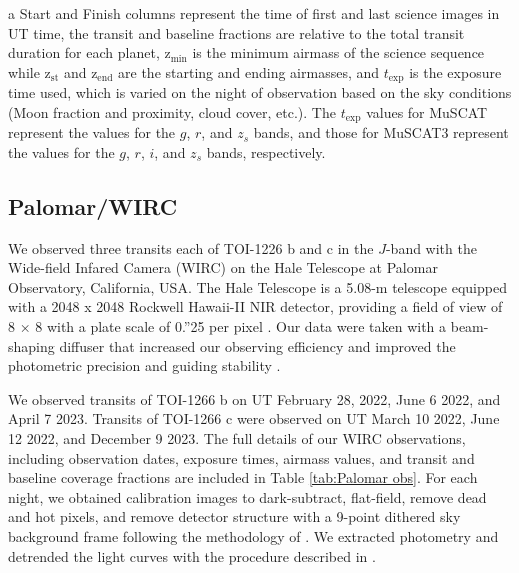 \documentclass[twocolumn]{aastex631}
\begin{document}
\begin{table}
\begin{tabular}{ccccccccccc}
\\ 
\hline
\end{tabular}
\begin{tablenotes}
      \item[a] Start and Finish columns represent the time of first and last science images in UT time, the transit and baseline fractions are relative to the total transit duration for each planet, z$_{\text{min}}$ is the minimum airmass of the science sequence while z$_{\text{st}}$ and z$_{\text{end}}$ are the starting and ending airmasses, and $t_{\text{exp}}$ is the exposure time used, which is varied on the night of observation based on the sky conditions (Moon fraction and proximity, cloud cover, etc.). The $t_{\text{exp}}$ values for MuSCAT represent the values for the $g$, $r$, and $z_s$ bands, and those for MuSCAT3 represent the values for the $g$, $r$, $i$, and $z_s$ bands, respectively.
\end{tablenotes}
\end{table}

\subsection{Palomar/WIRC}

We observed three transits each of TOI-1226 b and c in the $J$-band with the Wide-field Infared Camera (WIRC) on the Hale Telescope at Palomar Observatory, California, USA. The Hale Telescope is a 5.08-m telescope equipped with a 2048 x 2048 Rockwell Hawaii-II NIR detector, providing a field of view of 8 × 8 with a plate scale of 0.''25 per pixel \citep[WIRC,][]{Wilson2003}. Our data were taken with a beam-shaping diffuser that increased our observing efficiency and improved the photometric precision and guiding stability \citep{Stefansson2017,Vissapragada2020}. 

We observed transits of TOI-1266 b on UT February 28, 2022, June 6 2022, and April 7 2023. Transits of TOI-1266 c were observed on UT March 10 2022, June 12 2022, and December 9 2023. The full details of our WIRC observations, including observation dates, exposure times, airmass values, and transit and baseline coverage fractions are included in Table \ref{tab:Palomar obs}. For each night, we obtained calibration images to dark-subtract, flat-field, remove dead and hot pixels, and remove detector structure with a 9-point dithered sky background frame following the methodology of \cite{Vissapragada2020}. We extracted photometry and detrended the light curves with the procedure described in \cite{GreklekMcKeon2023}.
\end{document}
